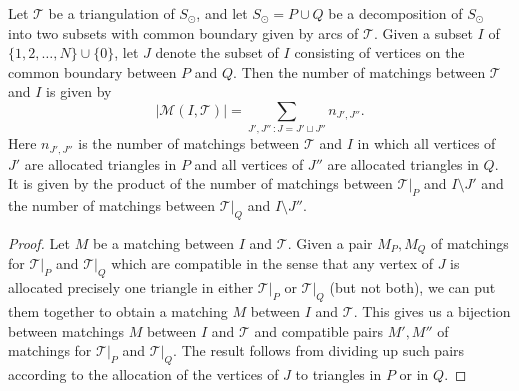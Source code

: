 \documentclass[a4paper]{amsart}
\begin{document}
\begin{lemma} \label{lem:decomposition}
Let ${\mathcal T}$ be a triangulation of $S_{\odot}$, and let
$S_{\odot}=P\cup Q$ be a decomposition of $S_{\odot}$ into two subsets
with common boundary given by arcs of ${\mathcal T}$. Given a subset
$I$ of $\{1,2,\ldots ,N\}\cup \{0\}$, let $J$ denote the subset of $I$
consisting of vertices on the common boundary between $P$ and $Q$.
Then the number of matchings between ${\mathcal T}$ and $I$ is given by
$$|{\mathcal M} (I,{\mathcal T})|=\sum_{J',J''\,:J=J'\sqcup J''} n_{J',J''}.$$
Here $n_{J',J''}$ is the number of matchings between ${\mathcal T}$ and $I$
in which all vertices of $J'$ are allocated triangles in $P$
and all vertices of $J''$ are allocated triangles in $Q$. It is
given by the product of the number of matchings between
${\mathcal T}|_P$ and $I\setminus J'$ and the number of matchings between
${\mathcal T}|_Q$ and $I\setminus J''$.
\end{lemma}

\begin{proof}
Let $M$ be a matching between $I$ and ${\mathcal T}$.
Given a pair $M_P,M_Q$ of matchings for ${\mathcal T}|_P$ and ${\mathcal T}|_Q$ which are
compatible in the sense that any vertex of $J$ is allocated precisely one
triangle in either ${\mathcal T}|_P$ or ${\mathcal T}|_Q$ (but not both), we
can put them together to obtain a matching $M$ between $I$ and ${\mathcal T}$.
This gives us a bijection between matchings $M$ between $I$ and ${\mathcal T}$
and compatible pairs $M',M''$ of matchings for ${\mathcal T}|_P$ and
${\mathcal T}|_Q$. The result follows from dividing up such pairs according to
the allocation of the vertices of $J$ to triangles in $P$ or in $Q$.
\end{proof}
\end{document}
